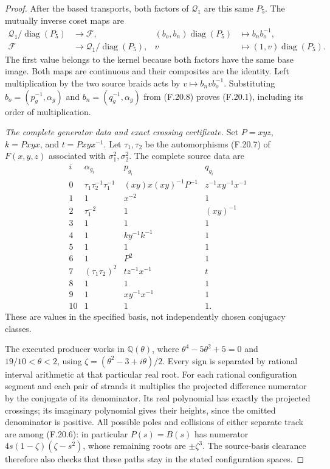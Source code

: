 \begin{proof}
After the based transports, both factors of
$\mathcal Q_1$ are this same $P_5$. The mutually inverse
coset maps are
\[
 \begin{aligned}
 \mathcal Q_1/\operatorname{diag}(P_5)&\longrightarrow\mathcal F,
       &(b_o,b_n)\operatorname{diag}(P_5)&\longmapsto b_nb_o^{-1},\\
 \mathcal F&\longrightarrow
                 \mathcal Q_1/\operatorname{diag}(P_5),
       &v&\longmapsto(1,v)\operatorname{diag}(P_5).
 \end{aligned}                                                \tag{F.20.11}
\]
The first value belongs to the kernel because both
factors have the same base image. Both maps are
continuous and their composites are the identity.
Left multiplication by the two source braids acts
by $v\mapsto b_nvb_o^{-1}$.
Substituting $b_o=(p_g^{-1},\alpha_g)$ and
$b_n=(q_g^{-1},\alpha_g)$ from (F.20.8) proves
(F.20.1), including its order of multiplication.

\emph{The complete generator data and exact crossing certificate.}
Set $P=xyz$, $k=Pxyx$, and $t=Pxyx^{-1}$.
Let $\tau_1,\tau_2$ be the automorphisms (F.20.7)
of $F(x,y,z)$ associated with $\sigma_1^2,\sigma_2^2$.
The complete source data are
\[
\begin{array}{c|c|c|c}
i&\alpha_{g_i}&p_{g_i}&q_{g_i}\\ \hline
0&\tau_1\tau_2^{-1}\tau_1^{-1}
  &(xy)x(xy)^{-1}P^{-1}&z^{-1}xy^{-1}x^{-1}\\
1&1&x^{-2}&1\\
2&\tau_1^{-2}&1&(xy)^{-1}\\
3&1&1&1\\
4&1&ky^{-1}k^{-1}&1\\
5&1&1&1\\
6&1&P^2&1\\
7&(\tau_1\tau_2)^2&tz^{-1}x^{-1}&t\\
8&1&1&1\\
9&1&xy^{-1}x^{-1}&1\\
10&1&1&1 .
\end{array}                                                   \tag{F.20.12}
\]
These are values in the specified basis, not
independently chosen conjugacy classes.

The executed producer
works in $\mathbb Q(\theta)$, where
$\theta^4-5\theta^2+5=0$ and $19/10<\theta<2$, using
$\zeta=(\theta^2-3+i\theta)/2$.
Every sign is separated by rational interval arithmetic
at that particular real root.
For each rational configuration segment and each pair
of strands it multiplies the projected difference
numerator by the conjugate of its denominator.
Its real polynomial has exactly the projected
crossings; its imaginary polynomial gives their
heights, since the omitted denominator is positive.
All possible poles and collisions of either separate
track are among (F.20.6): in particular
$P(s)=B(s)$ has numerator
$4s(1-\zeta)(\zeta-s^2)$, whose remaining roots
are $\pm\zeta^3$.
The source-basis clearance therefore also checks that
these paths stay in the stated configuration spaces.


\end{proof}
